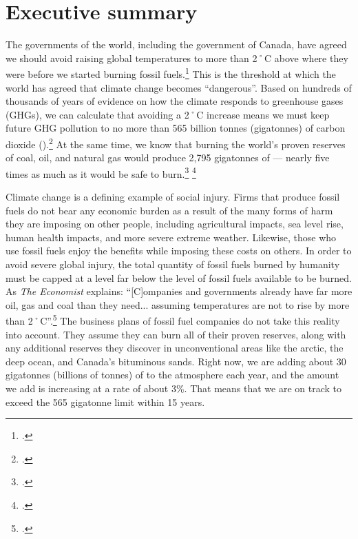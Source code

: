 

		\singlespacing
		\section{Executive summary}
		\label{sec:ExecutiveSummary}
		\doublespacing



The governments of the world, including the government of Canada, have agreed we should avoid raising global temperatures to more than 2˚C above where they were before we started burning fossil fuels.\footcite[][]{CopenhagenAccord}
This is the threshold at which the world has agreed that climate change becomes ``dangerous''.
Based on hundreds of thousands of years of evidence on how the climate responds to greenhouse gases (GHGs), we can calculate that avoiding a 2˚C increase means we must keep future GHG pollution to no more than 565 billion tonnes (gigatonnes) of carbon dioxide ().\footcite[For an excellent summary that is accessible to non-experts see: ][]{TerrifyingNewMath}
At the same time, we know that burning the world's proven reserves of coal, oil, and natural gas would produce 2,795 gigatonnes of  --- nearly five times as much as it would be safe to burn.\footcite[][]{CTI2012} \footcite[Another accessible summary of the issue can be found in: ][]{HotBackyard}



Climate change is a defining example of social injury.
Firms that produce fossil fuels do not bear any economic burden as a result of the many forms of harm they are imposing on other people, including agricultural impacts, sea level rise, human health impacts, and more severe extreme weather.
Likewise, those who use fossil fuels enjoy the benefits while imposing these costs on others.
In order to avoid severe global injury, the total quantity of fossil fuels burned by humanity must be capped at a level far below the level of fossil fuels available to be burned. As \emph{The Economist} explains: ``[C]ompanies and governments already have far more oil, gas and coal than they need... assuming temperatures are not to rise by more than 2˚C''.\footcite[][]{EconomistUnburnable}
The business plans of fossil fuel companies do not take this reality into account.
They assume they can burn all of their proven reserves, along with any additional reserves they discover in unconventional areas like the arctic, the deep ocean, and Canada's bituminous sands.
Right now, we are adding about 30 gigatonnes (billions of tonnes) of  to the atmosphere each year, and the amount we add is increasing at a rate of about 3\%.
That means that we are on track to exceed the 565 gigatonne limit within 15 years.



